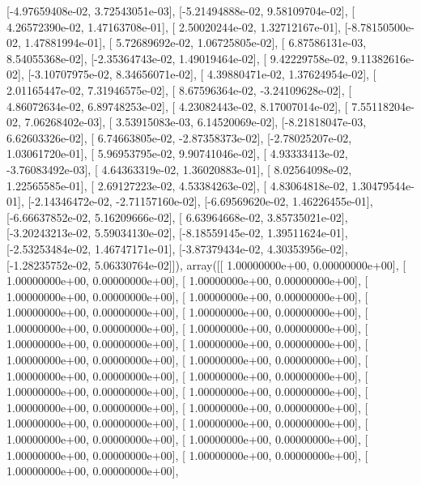 \documentclass{article}
\begin{document}
       [-4.97659408e-02,  3.72543051e-03],
       [-5.21494888e-02,  9.58109704e-02],
       [ 4.26572390e-02,  1.47163708e-01],
       [ 2.50020244e-02,  1.32712167e-01],
       [-8.78150500e-02,  1.47881994e-01],
       [ 5.72689692e-02,  1.06725805e-02],
       [ 6.87586131e-03,  8.54055368e-02],
       [-2.35364743e-02,  1.49019464e-02],
       [ 9.42229758e-02,  9.11382616e-02],
       [-3.10707975e-02,  8.34656071e-02],
       [ 4.39880471e-02,  1.37624954e-02],
       [ 2.01165447e-02,  7.31946575e-02],
       [ 8.67596364e-02, -3.24109628e-02],
       [ 4.86072634e-02,  6.89748253e-02],
       [ 4.23082443e-02,  8.17007014e-02],
       [ 7.55118204e-02,  7.06268402e-03],
       [ 3.53915083e-03,  6.14520069e-02],
       [-8.21818047e-03,  6.62603326e-02],
       [ 6.74663805e-02, -2.87358373e-02],
       [-2.78025207e-02,  1.03061720e-01],
       [ 5.96953795e-02,  9.90741046e-02],
       [ 4.93333413e-02, -3.76083492e-03],
       [ 4.64363319e-02,  1.36020883e-01],
       [ 8.02564098e-02,  1.22565585e-01],
       [ 2.69127223e-02,  4.53384263e-02],
       [ 4.83064818e-02,  1.30479544e-01],
       [-2.14346472e-02, -2.71157160e-02],
       [-6.69569620e-02,  1.46226455e-01],
       [-6.66637852e-02,  5.16209666e-02],
       [ 6.63964668e-02,  3.85735021e-02],
       [-3.20243213e-02,  5.59034130e-02],
       [-8.18559145e-02,  1.39511624e-01],
       [-2.53253484e-02,  1.46747171e-01],
       [-3.87379434e-02,  4.30353956e-02],
       [-1.28235752e-02,  5.06330764e-02]]), array([[ 1.00000000e+00,  0.00000000e+00],
       [ 1.00000000e+00,  0.00000000e+00],
       [ 1.00000000e+00,  0.00000000e+00],
       [ 1.00000000e+00,  0.00000000e+00],
       [ 1.00000000e+00,  0.00000000e+00],
       [ 1.00000000e+00,  0.00000000e+00],
       [ 1.00000000e+00,  0.00000000e+00],
       [ 1.00000000e+00,  0.00000000e+00],
       [ 1.00000000e+00,  0.00000000e+00],
       [ 1.00000000e+00,  0.00000000e+00],
       [ 1.00000000e+00,  0.00000000e+00],
       [ 1.00000000e+00,  0.00000000e+00],
       [ 1.00000000e+00,  0.00000000e+00],
       [ 1.00000000e+00,  0.00000000e+00],
       [ 1.00000000e+00,  0.00000000e+00],
       [ 1.00000000e+00,  0.00000000e+00],
       [ 1.00000000e+00,  0.00000000e+00],
       [ 1.00000000e+00,  0.00000000e+00],
       [ 1.00000000e+00,  0.00000000e+00],
       [ 1.00000000e+00,  0.00000000e+00],
       [ 1.00000000e+00,  0.00000000e+00],
       [ 1.00000000e+00,  0.00000000e+00],
       [ 1.00000000e+00,  0.00000000e+00],
       [ 1.00000000e+00,  0.00000000e+00],
       [ 1.00000000e+00,  0.00000000e+00],
       [ 1.00000000e+00,  0.00000000e+00],
\end{document}
